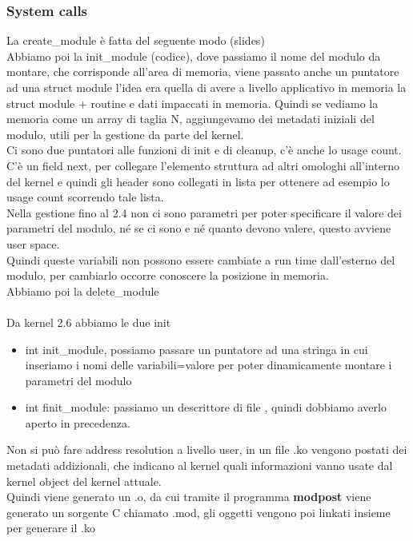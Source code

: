 \documentclass[12pt, oneside]{extbook}
\begin{document}
\subsubsection{System calls}
La \textsf{create\_module} è fatta del seguente modo (slides)\\Abbiamo poi la \textsf{init\_module} (codice), dove passiamo il nome del modulo da montare, che corrisponde all'area di memoria, viene passato anche un puntatore ad una \textsf{struct module} %
l'idea era quella di avere a livello applicativo in memoria la struct module + routine e dati impaccati in memoria. Quindi se vediamo la memoria come un array di taglia N, aggiungevamo dei metadati iniziali del modulo, utili per la gestione da parte del kernel.\\Ci sono due puntatori alle funzioni di init e di cleanup, c'è  anche lo usage count. C'è un field next, per collegare l'elemento struttura ad altri omologhi all'interno del kernel e quindi gli header sono collegati in lista per ottenere ad esempio lo usage count scorrendo tale lista.\\Nella gestione fino al 2.4 non ci sono parametri per poter specificare il valore dei parametri del modulo, né se ci sono e né quanto devono valere, questo avviene user space.\\ Quindi queste variabili non possono essere cambiate a run time dall'esterno del modulo, per cambiarlo occorre conoscere la posizione in memoria.\\Abbiamo poi la \textsf{delete\_module}\\\\Da kernel 2.6 abbiamo le due init
\begin{itemize}
\item \textsf{int init\_module}, possiamo passare un puntatore ad una stringa in cui inseriamo i nomi delle variabili=valore per poter dinamicamente montare i parametri del modulo
\item \textsf{int finit\_module}: passiamo un descrittore di file , quindi dobbiamo averlo aperto in precedenza.
\end{itemize}
Non si può fare address resolution a livello user, in un file .ko vengono postati dei metadati addizionali, che indicano al kernel quali informazioni vanno usate dal kernel object del kernel attuale.\\ Quindi viene generato un .o, da cui tramite il programma \textbf{modpost} viene generato un sorgente C chiamato \textsf{.mod}, gli oggetti vengono poi linkati insieme per generare il .ko\\
\end{document}
